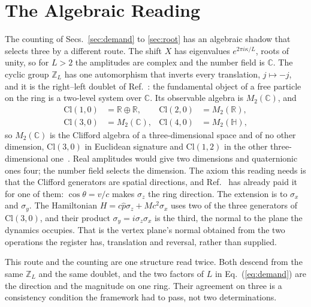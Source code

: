 \documentclass[aps,prd,twocolumn,superscriptaddress,nofootinbib]{revtex4-2}
\begin{document}
\section{The Algebraic Reading}
\label{sec:algebra}

The counting of Secs.~\ref{sec:demand} to \ref{sec:root} has an algebraic shadow that selects three by a different route. The shift $X$ has eigenvalues $e^{2\pi i\kappa/L}$, roots of unity, so for $L > 2$ the amplitudes are complex and the number field is $\mathbb{C}$. The cyclic group $\mathbb{Z}_L$ has one automorphism that inverts every translation, $j \mapsto -j$, and it is the right--left doublet of Ref.~\cite{korytko2026c}: the fundamental object of a free particle on the ring is a two-level system over $\mathbb{C}$. Its observable algebra is $M_2(\mathbb{C})$, and
\begin{align}
\mathrm{Cl}(1,0) &= \mathbb{R}\oplus\mathbb{R}, & \mathrm{Cl}(2,0) &= M_2(\mathbb{R}), \nonumber\\
\mathrm{Cl}(3,0) &= M_2(\mathbb{C}), & \mathrm{Cl}(4,0) &= M_2(\mathbb{H}),
\label{eq:clifford}
\end{align}
so $M_2(\mathbb{C})$ is the Clifford algebra of a three-dimensional space and of no other dimension, $\mathrm{Cl}(3,0)$ in Euclidean signature and $\mathrm{Cl}(1,2)$ in the other three-dimensional one~\cite{lounesto2001}. Real amplitudes would give two dimensions and quaternionic ones four; the number field selects the dimension. The axiom this reading needs is that the Clifford generators are spatial directions, and Ref.~\cite{korytko2026c} has already paid it for one of them: $\cos\theta = v/c$ makes $\sigma_z$ the ring direction. The extension is to $\sigma_x$ and $\sigma_y$. The Hamiltonian $H = c\hat p\sigma_z + Mc^2\sigma_x$ uses two of the three generators of $\mathrm{Cl}(3,0)$, and their product $\sigma_y = i\sigma_z\sigma_x$ is the third, the normal to the plane the dynamics occupies. That is the vertex plane's normal obtained from the two operations the register has, translation and reversal, rather than supplied.

This route and the counting are one structure read twice. Both descend from the same $\mathbb{Z}_L$ and the same doublet, and the two factors of $L$ in Eq.~(\ref{eq:demand}) are the direction and the magnitude on one ring. Their agreement on three is a consistency condition the framework had to pass, not two determinations.
\end{document}
